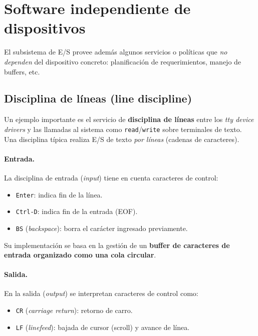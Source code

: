 \documentclass[11pt,a4paper]{article}
\begin{document}
\section{Software independiente de dispositivos}

El subsistema de E/S provee además algunos servicios o políticas que
\emph{no dependen} del dispositivo concreto: planificación de
requerimientos, manejo de buffers, etc.

\subsection{Disciplina de líneas (line discipline)}

Un ejemplo importante es el servicio de \textbf{disciplina de líneas}
entre los \emph{tty device drivers} y las llamadas al sistema como
\texttt{read}/\texttt{write} sobre terminales de texto. Una disciplina
típica realiza E/S de texto \emph{por líneas} (cadenas de caracteres).

\paragraph{Entrada.}
La disciplina de entrada (\emph{input}) tiene en cuenta caracteres de
control:

\begin{itemize}[leftmargin=*,nosep]
    \item \texttt{Enter}: indica fin de la línea.
    \item \texttt{Ctrl-D}: indica fin de la entrada (EOF).
    \item \texttt{BS} (\emph{backspace}): borra el carácter ingresado
        previamente.
\end{itemize}

Su implementación se basa en la gestión de un \textbf{buffer de
caracteres de entrada organizado como una cola circular}.

\paragraph{Salida.}
En la salida (\emph{output}) se interpretan caracteres de control como:

\begin{itemize}[leftmargin=*,nosep]
    \item \texttt{CR} (\emph{carriage return}): retorno de carro.
    \item \texttt{LF} (\emph{linefeed}): bajada de cursor (scroll) y
        avance de línea.
\end{itemize}
\end{document}
